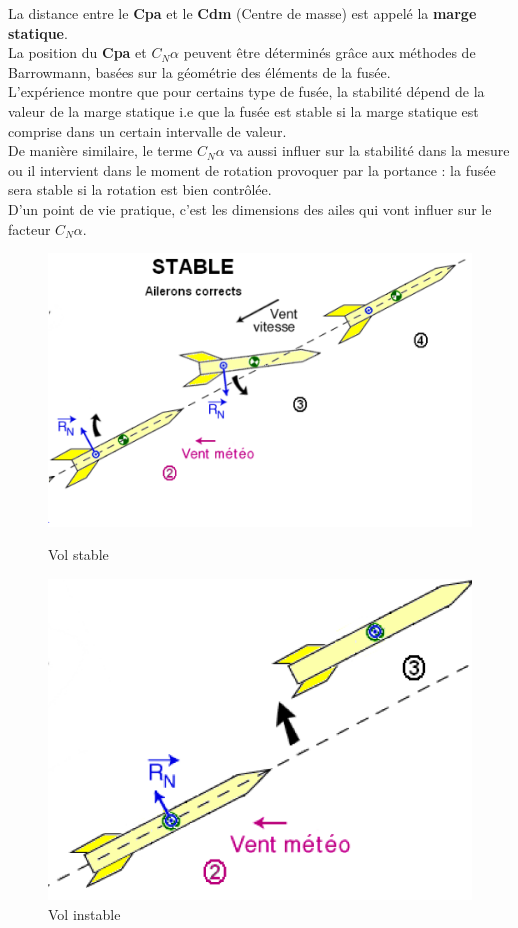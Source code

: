 \documentclass[a4paper]{article}
\begin{document}
La distance entre le \textbf{Cpa} et le \textbf{Cdm} (Centre de masse) est appelé la \textbf{marge statique}.\\
La position du \textbf{Cpa} et \textbf{$C_{N}\alpha$} peuvent être déterminés grâce aux méthodes de Barrowmann, basées sur la géométrie des éléments de la fusée.\\
L'expérience montre que pour certains type de fusée, la stabilité dépend de la valeur de la marge statique i.e que la fusée est stable si la marge statique est  comprise dans un certain intervalle de valeur.\\
De manière similaire, le terme \textbf{$C_{N}\alpha$} va aussi influer sur la stabilité dans la mesure ou il intervient dans le moment de rotation provoquer par la portance : la fusée sera stable si la rotation est bien contrôlée.\\
D'un point de vie pratique, c'est les dimensions des ailes qui vont influer sur le facteur  \textbf{$C_{N}\alpha$}.


\begin{figure}[h!]
  \centering
  \begin{minipage}[b]{0.4\textwidth}
    \includegraphics[width=\textwidth]{stable.png}
    \caption{Vol stable}
  \end{minipage}
  \hfill
  \begin{minipage}[b]{0.4\textwidth}
    \includegraphics[width=\textwidth]{instable.png}
    \caption{Vol instable}
  \end{minipage}
\end{figure}
\end{document}
